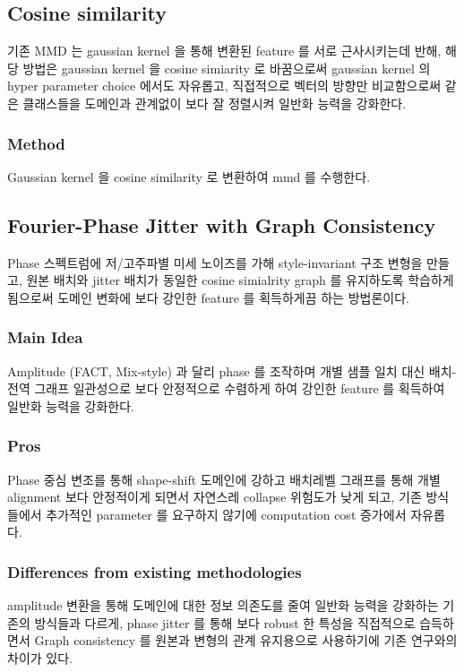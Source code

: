 \subsection{Cosine similarity}

기존 MMD 는 gaussian kernel 을 통해 변환된 feature 를 서로 근사시키는데 반해, 해당 방법은 gaussian kernel 을 cosine simiarity 로 바꿈으로써 gaussian kernel 의 hyper parameter choice 에서도 자유롭고, 직접적으로 벡터의 방향만 비교함으로써 같은 클래스들을 도메인과 관계없이 보다 잘 정렬시켜 일반화 능력을 강화한다.

\subsubsection{Method}
Gaussian kernel 을 cosine similarity 로 변환하여 mmd 를 수행한다.


\subsection{Fourier-Phase Jitter with Graph Consistency}

Phase 스펙트럼에 저/고주파별 미세 노이즈를 가해 style-invariant 구조 변형을 만들고, 원본 배치와 jitter 배치가 동일한 cosine simialrity graph 를 유지하도록 학습하게 됨으로써 도메인 변화에 보다 강인한 feature 를 획득하게끔 하는 방법론이다.

\subsubsection{Main Idea}
Amplitude (FACT, Mix-style) 과 달리 phase 를 조작하며 개별 샘플 일치 대신 배치-전역 그래프 일관성으로 보다 안정적으로 수렴하게 하여 강인한 feature 를 획득하여 일반화 능력을 강화한다.

\subsubsection{Pros}
Phase 중심 변조를 통해 shape-shift 도메인에 강하고 배치레벨 그래프를 통해 개별 alignment 보다 안정적이게 되면서 자연스레 collapse 위험도가 낮게 되고, 기존 방식들에서 추가적인 parameter 를 요구하지 않기에 computation cost 증가에서 자유롭다.

\subsubsection{Differences from existing methodologies}
amplitude 변환을 통해 도메인에 대한 정보 의존도를 줄여 일반화 능력을 강화하는 기존의 방식들과 다르게, phase jitter 를 통해 보다 robust 한 특성을 직접적으로 습득하면서 Graph consistency 를 원본과 변형의 관계 유지용으로 사용하기에 기존 연구와의 차이가 있다.


